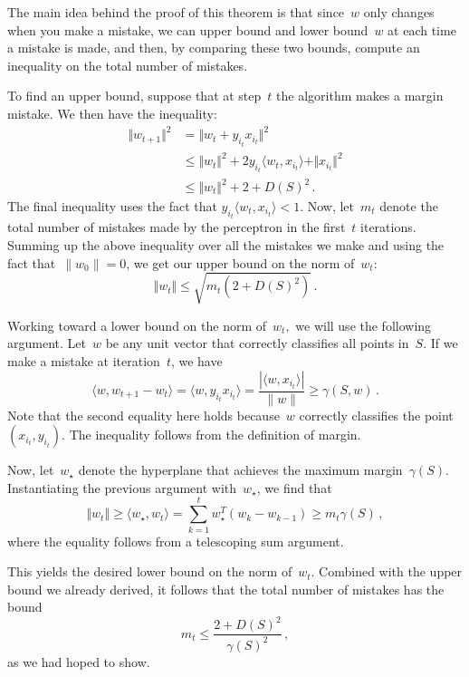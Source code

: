 \documentclass{tufte-book}
\begin{document}
\begin{Proof}

The main idea behind the proof of this theorem is that since~\(w\) only
changes when you make a mistake, we can upper bound and lower
bound~\(w\) at each time a mistake is made, and then, by comparing these
two bounds, compute an inequality on the total number of mistakes.

To find an upper bound, suppose that at step~\(t\) the algorithm makes a
margin mistake. We then have the inequality: \[
\begin{aligned}
    \Vert w_{t+1} \Vert^2
    &= \Vert w_t +y_{i_t} x_{i_t}\Vert^2 \\
    & \leq \Vert w_t \Vert^2 + 2 y_{i_t} \langle w_t, x_{i_t}\rangle + \Vert x_{i_t} \Vert^2 \\
    &\leq \Vert w_t\Vert^2 + 2 +  D(S)^2 \,.
\end{aligned}
\] The final inequality uses the fact that
\(y_{i_t} \langle w_t, x_{i_t}\rangle<1\). Now, let~\(m_t\) denote the
total number of mistakes made by the perceptron in the first~\(t\)
iterations. Summing up the above inequality over all the mistakes we
make and using the fact that~\(\|w_0\|=0\), we get our upper bound on
the norm of~\(w_t\): \[
    \Vert w_{t} \Vert \leq \sqrt{m_t(2+ D(S)^2)}\,.
\]

Working toward a lower bound on the norm of~\(w_t,\) we will use the
following argument. Let~\(w\) be any unit vector that correctly
classifies all points in~\(S\). If we make a mistake at iteration~\(t\),
we have \[
  \langle w, w_{t+1}-w_t\rangle
  = \langle w, y_{i_t}x_{i_t}\rangle
  = \frac{|\langle w, x_{i_t}\rangle|}{\|w\|}
  \geq \gamma(S, w)\,.
\] Note that the second equality here holds because~\(w\) correctly
classifies the point~\((x_{i_t}, y_{i_t})\). The
inequality follows from the definition of margin.

Now, let~\(w_\star\) denote the hyperplane that achieves the maximum
margin~\(\gamma(S)\). Instantiating the previous argument
with~\(w_\star\), we find that \[
    \Vert w_t \Vert \geq \langle w_\star,  w_t\rangle = \sum_{k=1}^t  w_\star^T (w_{k}-w_{k-1}) \geq m_t\gamma(S)\,,
\] where the equality follows from a telescoping sum
argument.

This yields the desired lower bound on the norm of~\(w_t\). Combined
with the upper bound we already derived, it follows that the total
number of mistakes has the bound \[
m_t \leq \frac{2+D(S)^2}{\gamma(S)^2}\,,
\] as we had hoped to show.

\end{Proof}
\end{document}
